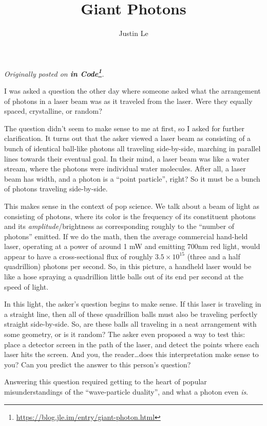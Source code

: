 \documentclass[]{article}
\title{Giant Photons}
\author{Justin Le}
\renewcommand{\href}[2]{#2\footnote{\url{#1}}}
\begin{document}
\maketitle

\emph{Originally posted on
\textbf{\href{https://blog.jle.im/entry/giant-photon.html}{in Code}}.}

I was asked a question the other day where someone asked what the arrangement of
photons in a laser beam was as it traveled from the laser. Were they equally
spaced, crystalline, or random?

The question didn't seem to make sense to me at first, so I asked for further
clarification. It turns out that the asker viewed a laser beam as consisting of
a bunch of identical ball-like photons all traveling side-by-side, marching in
parallel lines towards their eventual goal. In their mind, a laser beam was like
a water stream, where the photons were individual water molecules. After all, a
laser beam has width, and a photon is a ``point particle'', right? So it must be
a bunch of photons traveling side-by-side.

This makes sense in the context of pop science. We talk about a beam of light as
consisting of photons, where its color is the frequency of its constituent
photons and its \emph{amplitude}/brightness as corresponding roughly to the
``number of photons'' emitted. If we do the math, then the average commercial
hand-held laser, operating at a power of around 1 mW and emitting 700nm red
light, would appear to have a cross-sectional flux of roughly
\(3.5 \times 10^{15}\) (three and a half quadrillion) photons per second. So, in
this picture, a handheld laser would be like a hose spraying a quadrillion
little balls out of its end per second at the speed of light.

In this light, the asker's question begins to make sense. If this laser is
traveling in a straight line, then all of these quadrillion balls must also be
traveling perfectly straight side-by-side. So, are these balls all traveling in
a neat arrangement with some geometry, or is it random? The asker even proposed
a way to test this: place a detector screen in the path of the laser, and detect
the points where each laser hits the screen. And you, the reader\ldots does this
interpretation make sense to you? Can you predict the answer to this person's
question?

Answering this question required getting to the heart of popular
misunderstandings of the ``wave-particle duality'', and what a photon even
\emph{is}.
\end{document}
